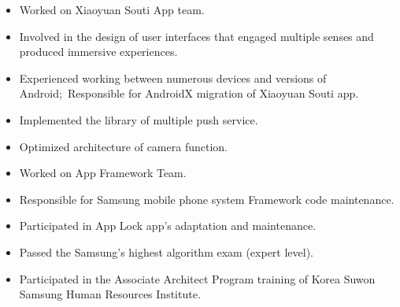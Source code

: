 \documentclass{resume}
\begin{document}
    \begin{itemize}
        \item Worked on Xiaoyuan Souti App team.
        \item Involved in the design of user interfaces that engaged multiple senses and produced immersive experiences.
        \item Experienced working between numerous devices and versions of Android;\ Responsible for AndroidX migration of Xiaoyuan Souti app.
        \item Implemented the library of multiple push service.
        \item Optimized architecture of camera function.
    \end{itemize}

    \begin{itemize}
        \item Worked on App Framework Team.
        \item Responsible for Samsung mobile phone system Framework code maintenance.
        \item Participated in App Lock app's adaptation and maintenance.
        \item Passed the Samsung's highest algorithm exam (expert level).
        \item Participated in the Associate Architect Program training of Korea Suwon Samsung Human Resources Institute.
    \end{itemize}
\end{document}
